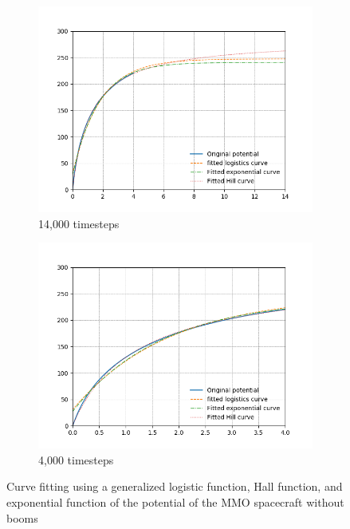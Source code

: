 \begin{center}
\begin{figure}[H]
  \begin{subfigure}[b]{0.61\textwidth}
    \includegraphics[width=\textwidth]{figures/Appendix/C_fit_NB.png}
    \caption{14,000 timesteps}
    \label{fig:C_fit_NB}
  \end{subfigure}
  \hfill
  \begin{subfigure}[b]{0.61\textwidth}
    \includegraphics[width=\textwidth]{figures/Appendix/C_fit_NB_lim.png}
    \caption{4,000 timesteps}
    \label{fig:C_fit_NB_lim}
  \end{subfigure}
  \label{fig:Pot_noPH}
  \caption{Curve fitting using a generalized logistic function, Hall function, and exponential function of the potential of the MMO spacecraft without booms}
\end{figure}
\end{center}


